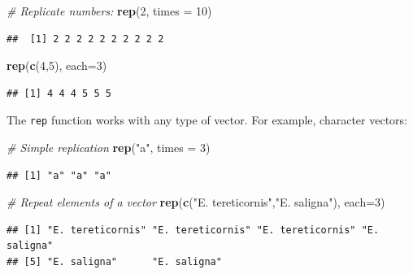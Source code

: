 \documentclass[]{book}
\newenvironment{Shaded}{\begin{snugshade}}{\end{snugshade}}
\newcommand{\CommentTok}[1]{\textcolor[rgb]{0.56,0.35,0.01}{\textit{#1}}}
\newcommand{\DataTypeTok}[1]{\textcolor[rgb]{0.13,0.29,0.53}{#1}}
\newcommand{\DecValTok}[1]{\textcolor[rgb]{0.00,0.00,0.81}{#1}}
\newcommand{\KeywordTok}[1]{\textcolor[rgb]{0.13,0.29,0.53}{\textbf{#1}}}
\newcommand{\NormalTok}[1]{#1}
\newcommand{\StringTok}[1]{\textcolor[rgb]{0.31,0.60,0.02}{#1}}
\begin{document}
\begin{Shaded}
\begin{Highlighting}[]
\CommentTok{# Replicate numbers:}
\KeywordTok{rep}\NormalTok{(}\DecValTok{2}\NormalTok{, }\DataTypeTok{times =} \DecValTok{10}\NormalTok{)}
\end{Highlighting}
\end{Shaded}

\begin{verbatim}
##  [1] 2 2 2 2 2 2 2 2 2 2
\end{verbatim}

\begin{Shaded}
\begin{Highlighting}[]
\KeywordTok{rep}\NormalTok{(}\KeywordTok{c}\NormalTok{(}\DecValTok{4}\NormalTok{,}\DecValTok{5}\NormalTok{), }\DataTypeTok{each=}\DecValTok{3}\NormalTok{)}
\end{Highlighting}
\end{Shaded}

\begin{verbatim}
## [1] 4 4 4 5 5 5
\end{verbatim}

The \texttt{rep} function works with any type of vector. For example, character vectors:

\begin{Shaded}
\begin{Highlighting}[]
\CommentTok{# Simple replication}
\KeywordTok{rep}\NormalTok{(}\StringTok{"a"}\NormalTok{, }\DataTypeTok{times =} \DecValTok{3}\NormalTok{)}
\end{Highlighting}
\end{Shaded}

\begin{verbatim}
## [1] "a" "a" "a"
\end{verbatim}

\begin{Shaded}
\begin{Highlighting}[]
\CommentTok{# Repeat elements of a vector}
\KeywordTok{rep}\NormalTok{(}\KeywordTok{c}\NormalTok{(}\StringTok{"E. tereticornis"}\NormalTok{,}\StringTok{"E. saligna"}\NormalTok{), }\DataTypeTok{each=}\DecValTok{3}\NormalTok{)}
\end{Highlighting}
\end{Shaded}

\begin{verbatim}
## [1] "E. tereticornis" "E. tereticornis" "E. tereticornis" "E. saligna"     
## [5] "E. saligna"      "E. saligna"
\end{verbatim}
\end{document}
